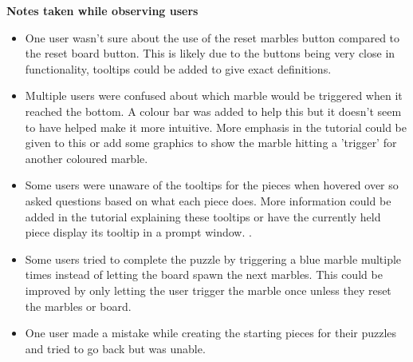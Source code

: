 \documentclass{l4proj}
\begin{document}
\textbf{Notes taken while observing users}
\begin{itemize}
    \item One user wasn't sure about the use of the reset marbles button compared to the reset board button. This is likely due to the buttons being very close in functionality, tooltips could be added to give exact definitions.
    \item Multiple users were confused about which marble would be triggered when it reached the bottom. A colour bar was added to help this but it doesn't seem to have helped make it more intuitive. More emphasis in the tutorial could be given to this or add some graphics to show the marble hitting a 'trigger' for another coloured marble.
    \item Some users were unaware of the tooltips for the pieces when hovered over so asked questions based on what each piece does. More information could be added in the tutorial explaining these tooltips or have the currently held piece display its tooltip in a prompt window. .
    \item Some users tried to complete the puzzle by triggering a blue marble multiple times instead of letting the board spawn the next marbles. This could be improved by only letting the user trigger the marble once unless they reset the marbles or board.
    \item One user made a mistake while creating the starting pieces for their puzzles and tried to go back but was unable.
\end{itemize}
\end{document}

